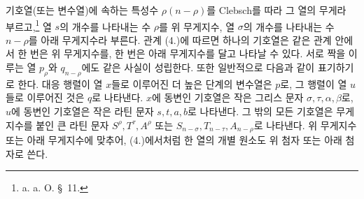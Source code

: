 
기호열(또는 변수열)에 속하는 특성수 $\rho(n-\rho)$를 Clebsch를 따라 그 열의 무게라 부르고,\footnote{a. a. O. \S\ 11.} 열 $s$의 개수를 나타내는 수 $\rho$를 위 무게지수, 열 $\sigma$의 개수를 나타내는 수 $n-\rho$를 아래 무게지수라 부른다. 관계 (4.)에 따르면 하나의 기호열은 같은 관계 안에서 한 번은 위 무게지수를, 한 번은 아래 무게지수를 달고 나타날 수 있다. 서로 짝을 이루는 열 $p_\rho$와 $q_{n-\rho}$에도 같은 사실이 성립한다. 또한 일반적으로 다음과 같이 표기하기로 한다. 대응 행렬이 열 $x$들로 이루어진 더 높은 단계의 변수열은 $p$로, 그 행렬이 열 $u$들로 이루어진 것은 $q$로 나타낸다. $x$에 동변인 기호열은 작은 그리스 문자 $\sigma,\tau,\alpha,\beta$로, $u$에 동변인 기호열은 작은 라틴 문자 $s,t,a,b$로 나타낸다. 그 밖의 모든 기호열은 무게지수를 붙인 큰 라틴 문자 $S^\rho,T^\tau,A^\rho$ 또는 $S_{n-\sigma},T_{n-\tau},A_{n-\rho}$로 나타낸다. 위 무게지수 또는 아래 무게지수에 맞추어, (4.)에서처럼 한 열의 개별 원소도 위 첨자 또는 아래 첨자로 쓴다.

